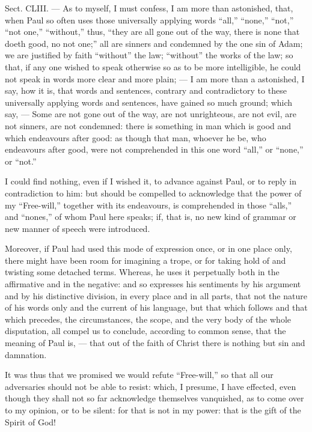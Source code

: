 
Sect. CLIII. — As to myself, I must confess, I am more than astonished, that, when Paul so often uses those universally applying words “all,” “none,” “not,” “not one,” “without,” thus, “they are all gone out of the way, there is none that doeth good, no not one;” all are sinners and condemned by the one sin of Adam; we are justified by faith “without” the law; “without” the works of the law; so that, if any one wished to speak otherwise so as to be more intelligible, he could not speak in words more clear and more plain; — I am more than a astonished, I say, how it is, that words and sentences, contrary and contradictory to these universally applying words and sentences, have gained so much ground; which say, — Some are not gone out of the way, are not unrighteous, are not evil, are not sinners, are not condemned: there is something in man which is good and which endeavours after good: as though that man, whoever he be, who endeavours after good, were not comprehended in this one word “all,” or “none,” or “not.”

I could find nothing, even if I wished it, to advance against Paul, or to reply in contradiction to him: but should be compelled to acknowledge that the power of my “Free-will,” together with its endeavours, is comprehended in those “alls,” and “nones,” of whom Paul here speaks; if, that is, no new kind of grammar or new manner of speech were introduced.

Moreover, if Paul had used this mode of expression once, or in one place only, there might have been room for imagining a trope, or for taking hold of and twisting some detached terms. Whereas, he uses it perpetually both in the affirmative and in the negative: and so expresses his sentiments by his argument and by his distinctive division, in every place and in all parts, that not the nature of his words only and the current of his language, but that which follows and that which precedes, the circumstances, the scope, and the very body of the whole disputation, all compel us to conclude, according to common sense, that the meaning of Paul is, — that out of the faith of Christ there is nothing but sin and damnation.

It was thus that we promised we would refute “Free-will,” so that all our adversaries should not be able to resist: which, I presume, I have effected, even though they shall not so far acknowledge themselves vanquished, as to come over to my opinion, or to be silent: for that is not in my power: that is the gift of the Spirit of God!

